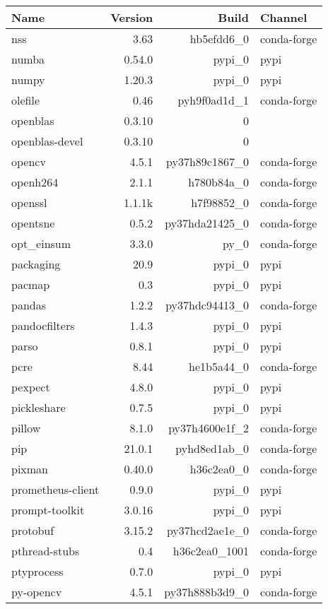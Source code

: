 \begin{table}
	\begin{center}
		\begin{tabular}{|l|r|r|l|}
			\textbf{Name} &\textbf{Version} &\textbf{Build} &\textbf{Channel} \\
			\hline
			nss &3.63 & hb5efdd6\_0 &conda-forge \\
			numba &0.54.0 & pypi\_0 &pypi \\
			numpy &1.20.3 & pypi\_0 &pypi \\
			olefile &0.46 & pyh9f0ad1d\_1 &conda-forge \\
			openblas &0.3.10 & 0 & \\
			openblas-devel &0.3.10 & 0 & \\
			opencv &4.5.1 & py37h89c1867\_0 &conda-forge \\
			openh264 &2.1.1 & h780b84a\_0 &conda-forge \\
			openssl &1.1.1k & h7f98852\_0 &conda-forge \\
			opentsne &0.5.2 & py37hda21425\_0 &conda-forge \\
			opt\_einsum &3.3.0 & py\_0 &conda-forge \\
			packaging &20.9 & pypi\_0 &pypi \\
			pacmap &0.3 & pypi\_0 &pypi \\
			pandas &1.2.2 & py37hdc94413\_0 &conda-forge \\
			pandocfilters &1.4.3 & pypi\_0 &pypi \\
			parso &0.8.1 & pypi\_0 &pypi \\
			pcre &8.44 & he1b5a44\_0 &conda-forge \\
			pexpect &4.8.0 & pypi\_0 &pypi \\
			pickleshare &0.7.5 & pypi\_0 &pypi \\
			pillow &8.1.0 & py37h4600e1f\_2 &conda-forge \\
			pip &21.0.1 & pyhd8ed1ab\_0 &conda-forge \\
			pixman &0.40.0 & h36c2ea0\_0 &conda-forge \\
			prometheus-client &0.9.0 & pypi\_0 &pypi \\
			prompt-toolkit &3.0.16 & pypi\_0 &pypi \\
			protobuf &3.15.2 & py37hcd2ae1e\_0 &conda-forge \\
			pthread-stubs &0.4 & h36c2ea0\_1001 &conda-forge \\
			ptyprocess &0.7.0 & pypi\_0 &pypi \\
			py-opencv &4.5.1 & py37h888b3d9\_0 &conda-forge \\

\end{tabular}
\end{center}
\end{table}
